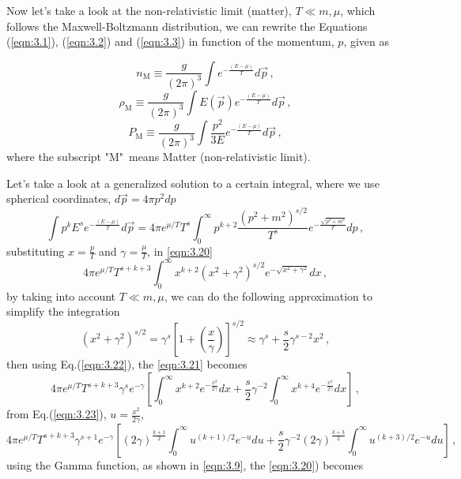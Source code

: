 Now let's take a look at the non-relativistic limit (matter), $T \ll m,\mu$, which follows the Maxwell-Boltzmann distribution, we can rewrite the Equations (\ref{eqn:3.1}), (\ref{eqn:3.2}) and (\ref{eqn:3.3}) in function of the momentum, $p$, given as

\begin{equation}
	\label{eqn:3.17}
	n_{\textrm{M}}\equiv\frac{g}{(2\pi)^3}\int e^{-\frac{(E-\mu)}{T}} d\vec{p}\,,
\end{equation}
\begin{equation}
	\label{eqn:3.18}
	\rho_{\textrm{M}}\equiv\frac{g}{(2\pi)^3}\int E(\vec{p})e^{-\frac{(E-\mu)}{T}} d\vec{p}\,,
\end{equation} 
\begin{equation}
	\label{eqn:3.19}
	P_{\textrm{M}}\equiv\frac{g}{(2\pi)^3}\int \frac{p^2}{3E}e^{-\frac{(E-\mu)}{T}} d\vec{p}\,,
\end{equation}  
where the subscript "M"\ means Matter (non-relativistic limit).

Let's take a look at a generalized solution to a certain integral, where we use spherical coordinates, $d\vec{p}=4\pi p^2 dp$
\begin{equation}
\label{eqn:3.20}
	\int p^k E^s e^{-\frac{(E-\mu)}{T}} d\vec{p}=4\pi e^{\mu/T}T^s\int_{0}^{\infty} p^{k+2} \frac{(p^2+m^2)^{s/2}}{T^s} e^{-\frac{\sqrt{p^2+m^2}}{T}} dp\,,
\end{equation}
substituting $x=\frac{p}{T}$ and $\gamma=\frac{\mu}{T}$, in \autoref{eqn:3.20}
\begin{equation}
	\label{eqn:3.21}
	4\pi e^{\mu/T}T^{s+k+3}\int_{0}^{\infty} x^{k+2}(x^2+\gamma^2)^{s/2}e^{-\sqrt{x^2+\gamma^2}} dx\,,
\end{equation}
by taking into account $T \ll m,\mu$, we can do the following approximation to simplify the integration
\begin{equation}
\label{eqn:3.22}
	(x^2+\gamma^2)^{s/2}=\gamma^s\left[1+\left(\frac{x}{\gamma}\right)\right]^{s/2} \approx \gamma^s+\frac{s}{2}\gamma^{s-2}x^2\,,
\end{equation}
then using Eq.(\ref{eqn:3.22}), the \autoref{eqn:3.21} becomes
\begin{equation}
	\label{eqn:3.23}
	4\pi e^{\mu/T}T^{s+k+3}\gamma^se^{-\gamma}\left[ \int_{0}^{\infty} x^{k+2}e^{-\frac{x^2}{2\gamma}}dx+\frac{s}{2}\gamma^{-2}\int_{0}^{\infty} x^{k+4}e^{-\frac{x^2}{2\gamma}}dx\right]\,,
\end{equation}
from Eq.(\ref{eqn:3.23}), $u=\frac{x^2}{2\gamma}$,
\begin{equation}
	4\pi e^{\mu/T}T^{s+k+3}\gamma^{s+1}e^{-\gamma}\left[(2\gamma)^{\frac{k+1}{2}}\int_{0}^{\infty} u^{(k+1)/2}e^{-u}du+\frac{s}{2}\gamma^{-2}(2\gamma)^{\frac{k+3}{2}}\int_{0}^{\infty} u^{(k+3)/2}e^{-u}du\right]\,,
\end{equation}
using the Gamma function, as shown in \autoref{eqn:3.9}, the \autoref{eqn:3.20}) becomes

